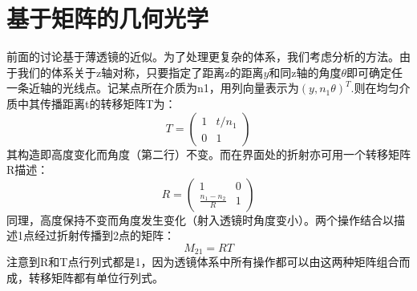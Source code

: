 \documentclass[12pt]{ctexart}%
\begin{document}
\section*{基于矩阵的几何光学}
前面的讨论基于薄透镜的近似。为了处理更复杂的体系，我们考虑分析的方法。由于我们的体系关于z轴对称，只要指定了距离z的距离$y$和同z轴的角度$\theta$即可确定任一条近轴的光线点。记某点所在介质为n1，用列向量表示为$(y,n_1\theta)^T$.则在均匀介质中其传播距离t的转移矩阵T为：
\begin{equation}
    T=\begin{pmatrix}
        1 & t/n_1 \\
        0 & 1
    \end{pmatrix}
\end{equation}
其构造即高度变化而角度（第二行）不变。而在界面处的折射亦可用一个转移矩阵R描述：
\begin{equation}
    R=\begin{pmatrix}
        1 & 0 \\
        \frac{n_1-n_2}{R} & 1
    \end{pmatrix}
\end{equation}
同理，高度保持不变而角度发生变化（射入透镜时角度变小）。两个操作结合以描述1点经过折射传播到2点的矩阵：
\begin{equation}
    M_{21}=RT
\end{equation}
注意到R和T点行列式都是1，因为透镜体系中所有操作都可以由这两种矩阵组合而成，转移矩阵都有单位行列式。
\end{document}
